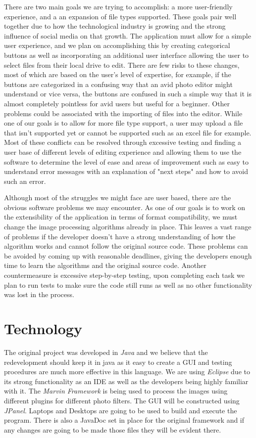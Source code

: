 \documentclass{article}
\begin{document}
\indent There are two main goals we are trying to accomplish: a more user-friendly experience, and a an expansion of file types supported. These goals pair well together due to how the technological industry is growing and the strong influence of social media on that growth. The application must allow for a simple user experience, and we plan on accomplishing this by creating categorical buttons as well as incorporating an additional user interface allowing the user to select files from their local drive to edit. There are few risks to these changes, most of which are based on the user's level of expertise, for example, if the buttons are categorized in a confusing way that an avid photo editor might understand or vice versa, the buttons are confused in such a simple way that it is almost completely pointless for avid users but useful for a beginner. Other problems could be associated with the importing of files into the editor. While one of our goals is to allow for more file type support, a user may upload a file that isn't supported yet or cannot be supported such as an excel file for example. Most of these conflicts can be resolved through excessive testing and finding a user base of different levels of editing experience and allowing them to use the software to determine the level of ease and areas of improvement such as easy to understand error messages with an explanation of "next steps" and how to avoid such an error.

Although most of the struggles we might face are user based, there are the obvious software problems we may encounter. As one of our goals is to work on the extensibility of the application in terms of format compatibility, we must change the image processing algorithms already in place. This leaves a vast range of problems if the developer doesn't have a strong understanding of how the algorithm works and cannot follow the original source code. These problems can be avoided by coming up with reasonable deadlines, giving the developers enough time to learn the algorithms and the original source code. Another countermeasure is excessive step-by-step testing, upon completing each task we plan to run tests to make sure the code still runs as well as no other functionality was lost in the process.

\section{Technology}
\indent The original project was developed in \textit{Java} and we believe that the redevelopment should keep it in java as it easy to create a GUI and testing procedures are much more effective in this language. We are using \textit{Eclipse} due to its strong functionality as an IDE as well as the developers being highly familiar with it. The \textit{Marvin Framework}  is being used to process the images using different plugins for different photo filters. The GUI will be constructed using \textit{JPanel}. Laptops and Desktops are going to be used to build and execute the program. There is also a JavaDoc set in place for the original framework and if any changes are going to be made those files they will be evident there.
\end{document}
